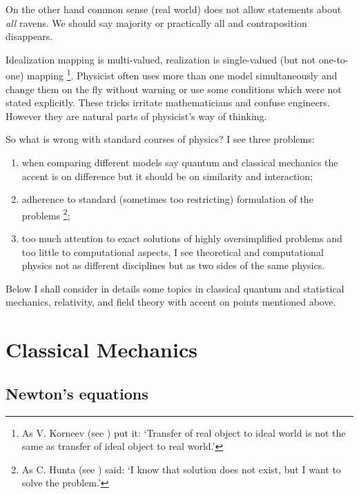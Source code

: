 \documentclass[11pt]{book}
\begin{document}
On the other hand common sense (real world) does not allow statements about {\em all} ravens. We should say majority or practically all and  contraposition  disappears.

Idealization mapping is multi-valued, realization is single-valued (but not one-to-one) mapping \footnote{As V. Korneev (see \cite{strugatsky}) put it: `Transfer of real object to ideal world
is not the same as transfer of ideal object to real world.'}. Physicist often uses more than one model simultaneously and change them on the fly without warning or use some conditions which were not stated explicitly. These tricks irritate mathematicians and confuse engineers. However they are natural parts of physicist's way of thinking.

So what is wrong with standard courses of physics? I see three problems:
\begin{enumerate}
    \item when comparing different models say quantum and classical mechanics the accent is 
        on difference but it should be on similarity and interaction;
    \item adherence to standard (sometimes too restricting) formulation of the problems \footnote{As C. Hunta (see \cite{strugatsky}) said: `I know that solution does not exist, but I want to solve the problem.'};
    \item too much attention to exact solutions of highly oversimplified problems and too little to computational aspects, I see theoretical and computational physics not as different disciplines but as two sides of the same physics.
\end{enumerate}



Below I shall consider in details some topics in classical quantum and statistical mechanics, relativity, and field theory with accent on points mentioned above.

\chapter{Classical Mechanics}
\label{class-mech}

\section{Newton's equations}
\label{newton-eqs}
\end{document}
